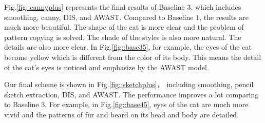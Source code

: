 \documentclass[10pt,twocolumn,letterpaper]{article}
\begin{document}
Fig.\ref{fig::cannyplus} represents the final results of Baseline $3$, which includes smoothing, canny, DIS, and AWAST. Compared to Baseline $1$, the results are much more beautiful. The shape of the cat is more clear and the problem of pattern copying is solved. The shade of the styles is also more natural. The details are also more clear. In Fig.\ref{fig::base35}, for example, the eyes of the cat become yellow which is different from the color of its body. This means the detail of the cat's eyes is noticed and emphasize by the AWAST model.

Our final scheme is shown in Fig.\ref{fig::sketchplus}， including smoothing, pencil sketch extraction, DIS, and AWAST. The performance improves a lot comparing to Baseline $3$.
For example, in Fig.\ref{fig::base45}, eyes of the cat are much more vivid and the patterns of fur and beard on its head and body are detailed.
\end{document}
